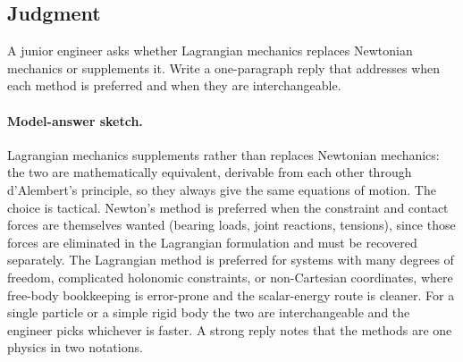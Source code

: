 \subsection*{Judgment}

\begin{exercise}
A junior engineer asks whether Lagrangian mechanics replaces Newtonian
mechanics or supplements it. Write a one-paragraph reply that
addresses when each method is preferred and when they are
interchangeable.

\paragraph{Model-answer sketch.} Lagrangian mechanics supplements
rather than replaces Newtonian mechanics: the two are mathematically
equivalent, derivable from each other through d'Alembert's principle, so
they always give the same equations of motion. The choice is tactical.
Newton's method is preferred when the constraint and contact forces are
themselves wanted (bearing loads, joint reactions, tensions), since
those forces are eliminated in the Lagrangian formulation and must be
recovered separately. The Lagrangian method is preferred for systems
with many degrees of freedom, complicated holonomic constraints, or
non-Cartesian coordinates, where free-body bookkeeping is error-prone and
the scalar-energy route is cleaner. For a single particle or a simple
rigid body the two are interchangeable and the engineer picks whichever
is faster. A strong reply notes that the methods are one physics in two
notations.
\end{exercise}

